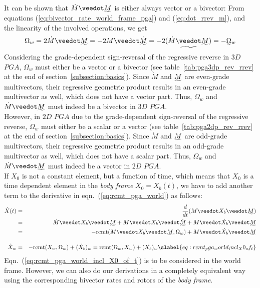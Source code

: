 It can be shown that $\dot{M} \veedot \rrev{M}$ is either always vector or a bivector:
From equations (\ref{eq:bivector_rate_world_frame_pga}) and (\ref{eq:dot_rrev_m}), and the
linearity of the involved operations, we get
\begin{equation}
   \Omega_w = 2 \dot{M} \veedot \rrev{M} = - 2 M \veedot
   \dot{\rrev{M}} = - 2 (\rrev{\dot{M} \veedot \rrev{M} })= -\rrev{\Omega}_w
   \label{eq:bivector_poof_rgpr}
\end{equation}
Considering the grade-dependent sign-reversal of the regressive reverse in $3D$ $PGA$,
$\Omega_w$ must either be a vector or a bivector (see table~\ref{tab:pga3dp_rev_rrev} at
the end of section~\ref{subsection:basics}). Since $\dot{M}$ and $\rrev{M}$ are even-grade
multivectors, their regressive geometric product results in an even-grade multivector as
well, which does not have a vector part. Thus, $\Omega_w$ and $\dot{M} \veedot \rrev{M}$
must indeed be a bivector in $3D$ $PGA$. \\

However, in $2D$ $PGA$ due to the grade-dependent sign-reversal of the regressive reverse,
$\Omega_w$ must either be a scalar or a vector (see table~\ref{tab:pga2dp_rev_rrev} at the
end of section~\ref{subsection:basics}). Since $\dot{M}$ and $\rrev{M}$ are odd-grade
multivectors, their regressive geometric product results in an odd-grade multivector as
well, which does not have a scalar part. Thus, $\Omega_w$ and $\dot{M} \veedot \rrev{M}$
must indeed be a vector in $2D$ $PGA$. \\

If $X_0$ is not a constant element, but a function of time, which means that $X_0$ is a
time dependent element in the \emph{body frame} $X_0 = X_b(t)$, we have to add another
term to the derivative in eqn.~(\ref{eq:rcmt_pga_world}) as follows:
\begin{eqnarray}
   \dot{X}(t) &=& \frac{d}{dt}(M \veedot X_b \veedot \rrev{M}) \nonumber \\
              &=& \dot{M} \veedot X_b \veedot \rrev{M} + M \veedot X_b \veedot
                  \dot{\rrev{M}} + M \veedot \dot{X_b} \veedot \rrev{M} \nonumber \\
              &=& -\mathrm{rcmt}(M\veedot X_b \veedot\rrev{M},\Omega_w)
                  + M \veedot \dot{X_b} \veedot \rrev{M} \nonumber \\[10 pt]
   \dot{X}_w  &=& -\mathrm{rcmt}(X_w,\Omega_w) + (\dot{X_b})_w
               = \mathrm{rcmt}(\Omega_w,X_w)+ (\dot{X_b})_w
   \slabel{eq:rcmt_pga_world_incl_X0_of_t}
\end{eqnarray}
Eqn.~(\ref{eq:rcmt_pga_world_incl_X0_of_t}) is to be considered in the world frame.
However, we can also do our derivations in a completely equivalent way using the
corresponding bivector rates and rotors of the \emph{body frame}. \\

